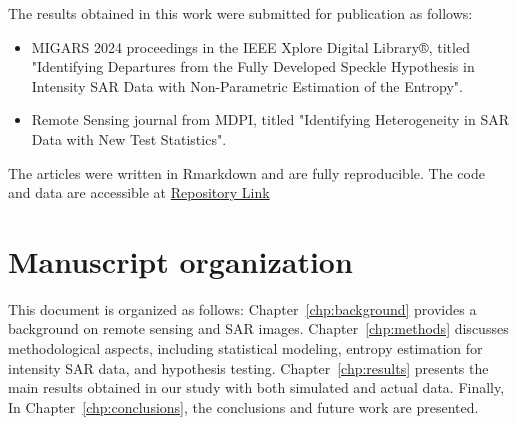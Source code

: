 The results obtained in this work were submitted for publication as follows:
\begin{itemize}
    \item  MIGARS 2024 proceedings in the IEEE Xplore Digital Library®, titled "Identifying Departures from the Fully Developed Speckle Hypothesis in Intensity SAR Data with Non-Parametric Estimation of the Entropy".
    \item  Remote Sensing journal from MDPI, titled "Identifying Heterogeneity in SAR Data with New Test Statistics".
\end{itemize}
The articles were written in Rmarkdown and are fully reproducible. 
The code and data are accessible at 
\href{https://github.com/rjaneth/identifying-heterogeneity-in-sar-data-with-new-test-statistics}{\textcolor[rgb]{0,0,1}{Repository Link}}


\section{Manuscript organization}\label{sec:research_questions}

\hypersetup{linkcolor=blue}
This document is organized as follows: 
Chapter~\ref{chp:background} provides a background on remote sensing and SAR images. 
Chapter~\ref{chp:methods} discusses methodological aspects, including statistical modeling, entropy estimation for intensity SAR data, and hypothesis testing. 
Chapter~\ref{chp:results} presents the main results obtained in our study with both simulated and actual data. Finally,
In Chapter~\ref{chp:conclusions}, the conclusions and future work are presented.

